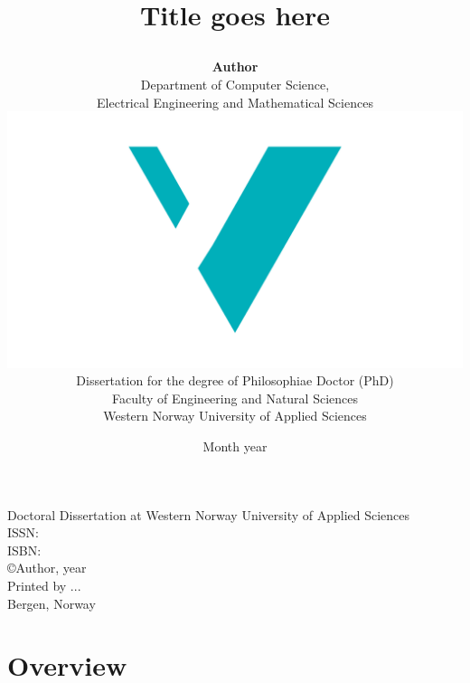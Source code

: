 \documentclass[10pt]{book}
\title{
{\fontsize{28}{30}\usefont{OT1}{phv}{bc}{n}\selectfont Title goes here}
	\author{
	\textbf{Author}\vspace{1cm}\\
		Department of Computer Science, \\ 
		Electrical Engineering and Mathematical Sciences \vspace{1cm}\\
		\includegraphics[scale=0.36]{logos/logo.pdf}\vspace{2em}\\
		Dissertation for the degree of Philosophiae Doctor (PhD)\vspace{0.5em}\\
		Faculty of Engineering and Natural Sciences \vspace{0.3cm}\\
		Western Norway University of Applied Sciences
	}
	\date{Month year}
}
\begin{document}

\ifDownscaledFinalDoc
	\fontsize{\TextSize}{\BaseLineSkip}
	\selectfont
\fi

\ifDraft
	\doublespacing
\fi


\maketitle
\normalsize\vspace*{15cm}
\begin{minipage}{13cm}
Doctoral Dissertation at Western Norway University of Applied Sciences\\
ISSN: \\ %
ISBN: \\[2ex] %
\copyright{Author}, year\\[2ex] %
Printed by ...\\
Bergen, Norway
\end{minipage}

\frontmatter





\tableofcontents
\mainmatter

%
%
\part{Overview}
\label{part:1}



%
%
%
%


\end{document}
